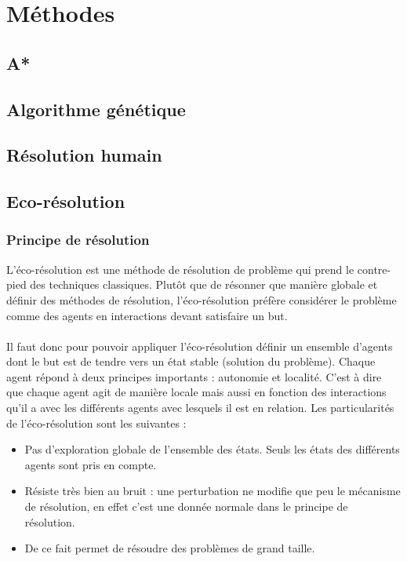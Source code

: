 \chapter{Méthodes}
    \section{A*}
    \section{Algorithme génétique}
    \section{Résolution humain}
    \section{Eco-résolution}
    \subsection{Principe de résolution}
		L'éco-résolution est une méthode de résolution de problème qui prend le contre-pied des techniques classiques. Plutôt que de résonner que manière globale et définir des méthodes de résolution, l'éco-résolution préfère considérer le problème comme des agents en interactions devant satisfaire un but. \\ \\
		Il faut donc pour pouvoir appliquer l'éco-résolution définir un ensemble d'agents dont le but est de tendre vers un état stable (solution du problème). Chaque agent répond à deux principes importants : autonomie et localité. C'est à dire que chaque agent agit de manière locale mais aussi en fonction des interactions qu'il a avec les différents agents avec lesquels il est en relation.  
		Les particularités de l'éco-résolution sont les suivantes : 
		\begin{itemize}
		\item Pas d'exploration globale de l'ensemble des états. Seuls les états des différents agents sont pris en compte. 
		\item Résiste très bien au bruit : une perturbation ne modifie que peu le mécanisme de résolution, en effet c'est une donnée normale dans le principe de résolution.
		\item De ce fait permet de résoudre des problèmes de grand taille. 
		\end{itemize}
